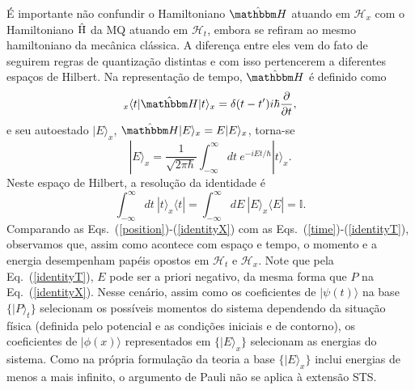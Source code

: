É importante não confundir o Hamiltoniano ${\hat {\mathbbm H}}$ atuando em ${\mathcal H}_x$ com o Hamiltoniano ${\hat {\textrm H}}$ da MQ atuando em ${\mathcal H}_t$, embora se refiram ao mesmo hamiltoniano da mecânica clássica. A diferença entre eles vem do fato de seguirem regras de quantização distintas e com isso pertencerem a diferentes espaços de Hilbert. Na representação de tempo, ${\hat {\mathbbm H}}$ é definido como
\begin{equation}\label{energy}
{_x \langle} t|{\hat {\mathbbm H}}|t\rangle_x =\delta(t-t')i\hbar \frac{\partial}{\partial t},
\end{equation}
e seu autoestado $|E\rangle_x$, ${\hat {\mathbbm H}}|E\rangle_x= E |E\rangle_x$, torna-se
\begin{equation}\label{autoestadoH}
|E\rangle_x=\frac{1}{\sqrt{2\pi \hbar}} \int_{-\infty}^{\infty}dt~ e^{-iE t/\hbar} |t\rangle_x.
\end{equation}
Neste espaço de Hilbert, a resolução da identidade é
\begin{equation}\label{identityT}
\int_{-\infty}^{\infty} dt ~|t\rangle_x\langle t|=\int_{-\infty}^{\infty} dE~ |E\rangle_x\langle E|= \mathbb{I }.
\end{equation}
Comparando as Eqs.~(\ref{position})-(\ref{identityX}) com as Eqs.~(\ref{time})-(\ref{identityT}), observamos que, assim como acontece com espaço e tempo, o momento e a energia desempenham papéis opostos em ${\mathcal H}_t$ e ${\mathcal H}_x$. Note que pela Eq.~(\ref{identityT}), $E$ pode ser a priori negativo, da mesma forma que $P$ na Eq.~(\ref{identityX}). Nesse cenário, assim como os coeficientes de $|\psi(t)\rangle$ na base $\{|P\rangle_t\}$ selecionam os possíveis momentos do sistema dependendo da situação física (definida pelo potencial e as condições iniciais e de contorno), os coeficientes de $|\phi(x)\rangle$ representados em $\{|E\rangle_x\}$ selecionam as energias do sistema. Como na própria formulação da teoria a base $\{|E\rangle_x\}$ inclui energias de menos a mais infinito, o argumento de Pauli não se aplica à extensão STS.


